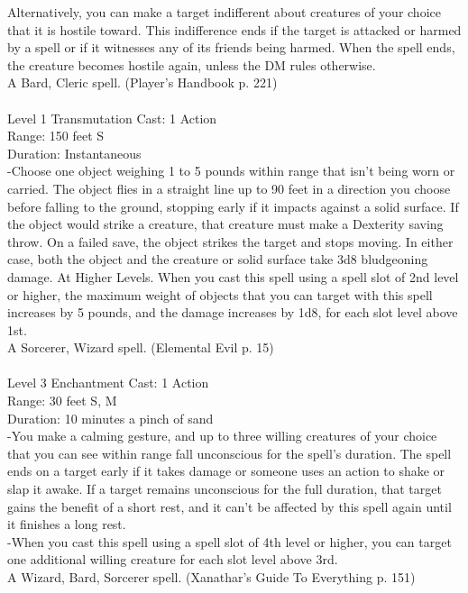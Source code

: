 \documentclass[10pt,twocolumn]{report}
\begin{document}
Alternatively, you can make a target indifferent about creatures of your choice that it is hostile toward. This indifference ends if the target is attacked or harmed by a spell or if it witnesses any of its friends being harmed. When the spell ends, the creature becomes hostile again, unless the DM rules otherwise.\\
A Bard, Cleric spell. (Player's Handbook p. 221) \\


 \\
Level 1 \quad Transmutation \quad Cast: 1 Action\\
Range: 150 feet \quad S\\
Duration: Instantaneous \quad \\
-Choose one object weighing 1 to 5 pounds within range that isn’t being worn or carried. The object flies in a straight line up to 90 feet in a direction you choose before falling to the ground, stopping early if it impacts against a solid surface. If the object would strike a creature, that creature must make a Dexterity saving throw. On a failed save, the object strikes the target and stops moving. In either case, both the object and the creature or solid surface take 3d8 bludgeoning damage.
At Higher Levels. When you cast this spell using a spell slot of 2nd level or higher, the maximum weight of objects that you can target with this spell increases by 5 pounds, and the damage increases by 1d8, for each slot level above 1st.\\
A Sorcerer, Wizard spell. (Elemental Evil p. 15) \\


 \\
Level 3 \quad Enchantment \quad Cast: 1 Action\\
Range: 30 feet \quad S, M\\
Duration: 10 minutes \quad a pinch of sand\\
-You make a calming gesture, and up to three willing creatures of your choice that you can see within range fall unconscious for the spell’s duration. The spell ends on a target early if it takes damage or someone uses an action to shake or slap it awake. If a target remains unconscious for the full duration, that target gains the benefit of a short rest, and it can’t be affected by this spell again until it finishes a long rest.\\
-When you cast this spell using a spell slot of 4th level or higher, you can target one additional willing creature for each slot level above 3rd.\\
A Wizard, Bard, Sorcerer spell. (Xanathar's Guide To Everything p. 151) \\
\end{document}
